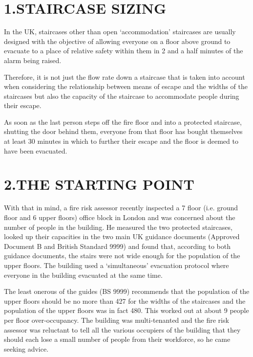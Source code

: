 \documentclass{style/llncs}
\begin{document}
\section{1.\hspace*{0.5em}STAIRCASE SIZING}\label{sec-intro}%

\noindent{}In the UK, staircases other than open ‘accommodation’ staircases are usually designed with the objective of allowing everyone on a floor above ground to evacuate to a place of relative safety within them in 2 and a half minutes of the alarm being raised. %

Therefore, it is not just the flow rate down a staircase that is taken into account when considering the relationship between means of escape and the widths of the staircases but also the capacity of the staircase to accommodate people during their escape.%

As soon as the last person steps off the fire floor and into a protected staircase, shutting the door behind them, everyone from that floor has bought themselves at least 30 minutes in which to further their escape and the floor is deemed to have been evacuated.%

\section{2.\hspace*{0.5em}THE STARTING POINT}\label{sec-the-starting-point}%

\noindent{}With that in mind, a fire risk assessor recently inspected a 7 floor (i.e. ground floor and 6 upper floors) office block in London and was concerned about the number of people in the building.  He measured the two protected staircases, looked up their capacities in the two main UK guidance documents (Approved Document B and British Standard 9999) and found that, according to both guidance documents, the stairs were not wide enough for the population of the upper floors.  The building used a ‘simultaneous’ evacuation protocol where everyone in the building evacuated at the same time.%

The least onerous of the guides (BS 9999) recommends that the population of the upper floors should be no more than 427 for the widths of the staircases and the population of the upper floors was in fact 480.  This worked out at about 9 people per floor over-occupancy.  The building was multi-tenanted and the fire risk assessor was reluctant to tell all the various occupiers of the building that they should each lose a small number of people from their workforce, so he came seeking advice.%
\end{document}
